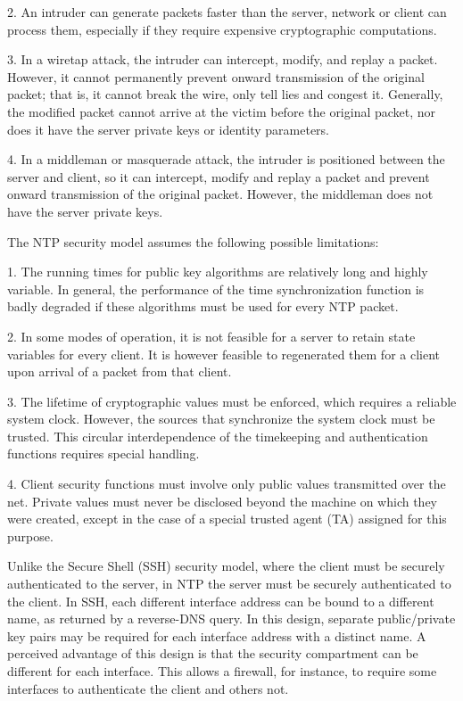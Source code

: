 2.  An intruder can generate packets faster than the server, network
or client can process them, especially if they require expensive
cryptographic computations.

3.  In a wiretap attack, the intruder can intercept, modify, and
replay a packet.  However, it cannot permanently prevent onward
transmission of the original packet; that is, it cannot break the
wire, only tell lies and congest it.  Generally, the modified
packet cannot arrive at the victim before the original packet,
nor does it have the server private keys or identity parameters.

4.  In a middleman or masquerade attack, the intruder is positioned
between the server and client, so it can intercept, modify and
replay a packet and prevent onward transmission of the original
packet.  However, the middleman does not have the server private
keys.

The NTP security model assumes the following possible limitations:

1.  The running times for public key algorithms are relatively long
and highly variable.  In general, the performance of the time
synchronization function is badly degraded if these algorithms
must be used for every NTP packet.

2.  In some modes of operation, it is not feasible for a server to
retain state variables for every client.  It is however feasible
to regenerated them for a client upon arrival of a packet from
that client.

3.  The lifetime of cryptographic values must be enforced, which
requires a reliable system clock.  However, the sources that
synchronize the system clock must be trusted.  This circular
interdependence of the timekeeping and authentication functions
requires special handling.

4.  Client security functions must involve only public values
transmitted over the net.  Private values must never be disclosed
beyond the machine on which they were created, except in the case
of a special trusted agent (TA) assigned for this purpose.

Unlike the Secure Shell (SSH) security model, where the client must
be securely authenticated to the server, in NTP the server must be
securely authenticated to the client.  In SSH, each different
interface address can be bound to a different name, as returned by a
reverse-DNS query.  In this design, separate public/private key pairs
may be required for each interface address with a distinct name.  A
perceived advantage of this design is that the security compartment
can be different for each interface.  This allows a firewall, for
instance, to require some interfaces to authenticate the client and
others not.

